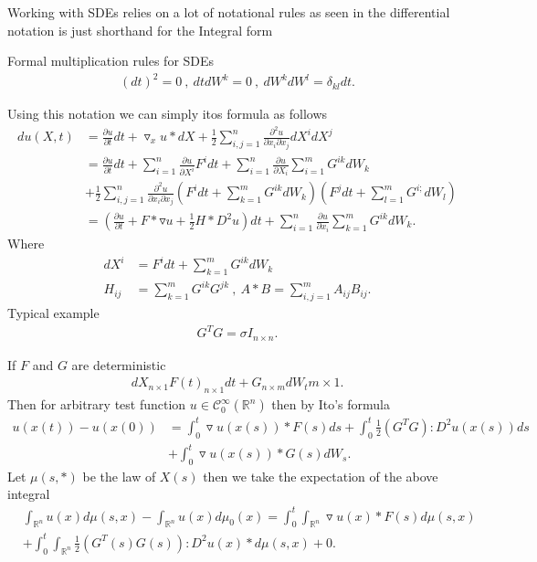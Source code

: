 Working with SDEs relies on a lot of notational rules as seen in the differential notation is just shorthand for the Integral form 
\begin{definition}
 Formal multiplication rules for SDEs
 \begin{align*}
   (dt)^2 = 0 \ , \ dt dW^{k} = 0 \ , \ dW^{k}dW^{l} = \delta_{kl} dt    
 .\end{align*}
\end{definition}
Using this notation we can simply itos formula as follows 
\begin{align*}
  du(X,t) &= \frac{\partial u}{\partial t} dt + \triangledown_x u*dX + \frac{1}{2}\sum_{i,j=1}^{n} \frac{\partial ^2  u}{\partial x_i \partial x_j}   dX^{i}dX^{j}   \\ 
          &= \frac{\partial u}{\partial t} dt + \sum_{i=1}^{n} \frac{\partial u}{\partial X^{i} } F^{i} dt + \sum_{i=1}^{n} \frac{\partial u }{\partial X_i}      \sum_{i=1}^{m} G^{ik} d W_k   \\
          &+  \frac{1}{2} \sum_{i,j=1}^{n}  \frac{\partial ^2  u}{\partial x_i \partial x_j} \left(F^{i} dt + \sum_{k=1}^{m} G^{ik} dW_k   \right)\left( F^{j} dt + \sum_{l=1}^{m} G^{i;} dW_l    \right)   \\
          &= (\frac{\partial u}{\partial t} + F*\triangledown u + \frac{1}{2} H*D^2 u) dt + \sum_{i=1}^{n} \frac{\partial u}{\partial x_i} \sum_{k=1}^{m} G^{ik} dW_{k}
.\end{align*}
Where 
\begin{align*}
  dX^{i} &= F^{i} dt + \sum_{k=1}^{m}  G^{ik} dW_k   \\
  H_{ij} &= \sum_{k=1}^{m} G^{ik}G^{jk}  \ , \ A *B = \sum_{i,j=1}^{m} A_{ij} B_{ij} 
.\end{align*}
Typical example 
\begin{align*}
G^{T}G = \sigma  I_{n \times  n} 
.\end{align*}
\begin{example}
 If $F$ and $G$ are deterministic 
 \begin{align*}
   dX_{n \times  1} F(t)_{n \times  1} dt + G_{n \times  m} dW_t{m \times  1}
 .\end{align*}
 Then for arbitrary test function $u \in  \mathcal{C}_0^{\infty}(\mathbb{R}^{n} ) $ then by Ito's formula 
 \begin{align*}
   u(x(t)) - u(x(0)) &= \int_0^{t} \triangledown u (x(s)) * F(s) ds + \int_0^{t}  \frac{1}{2}(G^{T}G ) : D^2u(x(s)) ds \\
                     &+ \int_0^{t} \triangledown u(x(s)) * G(s) dW_{s} 
 .\end{align*}
 Let $\mu(s,*)$  be the law of $X(s)$ then we take the expectation of the above integral 
 \begin{align*}
   &\int_{\mathbb{R}^{n} } u(x) d\mu(s,x) - \int_{\mathbb{R}^{n} } u(x) d\mu_0(x)  =  \int_{0}^{t} \int_{\mathbb{R}^{n} }  \triangledown u(x) * F(s) d\mu(s,x)  \\
   &+ \int_0^{t} \int_{\mathbb{R}^{n} }  \frac{1}{2}(G^{T}(s)G(s)) : D^2 u(x) * d\mu (s,x) + 0
 .\end{align*}
\end{example}
